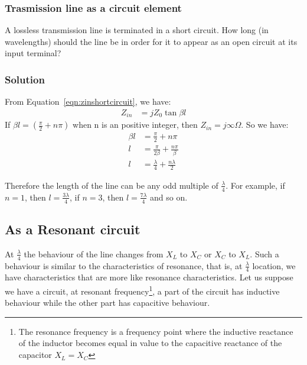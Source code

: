 \begin{exmp}
\subsubsection*{Trasmission line as a circuit element}
A lossless transmission line is terminated in a short circuit. How long (in wavelengths) should the line be in order for it to appear as an open circuit at its input terminal?

\subsubsection*{Solution}
From Equation~\eqref{eqn:zinshortcircuit}, we have:
\begin{align*}
Z_{in} &= jZ_{0}\tan\beta l
\end{align*}
If $\beta l = (\frac{\pi}{2} + n\pi)$ when n is an positive integer, then $Z_{in} = j\infty\varOmega$. So we have:
\begin{align*}
\beta l &= \frac{\pi}{2} + n\pi\\
l &= \frac{\pi}{2\beta} + \frac{n\pi}{\beta}\\
l &= \frac{\lambda}{4} + \frac{n\lambda}{2}
\end{align*}

Therefore the length of the line can be any odd multiple of $\frac{\lambda}{4}$. For example, if $n = 1$, then $l = \frac{3\lambda}{4}$, if $n = 3$, then $l = \frac{7\lambda}{4}$ and so on.
\end{exmp}

\subsection{As a Resonant circuit}
At $ \frac{\lambda}{4} $ the behaviour of the line changes from $ X_{L} $ to $ X_{C} $ or $ X_{C} $ to $ X_{L} $. Such a behaviour is similar to the characteristics of resonance, that is, at $\frac{\lambda}{4}$ location, we have characteristics that are more like resonance characteristics. Let us suppose we have a circuit, at resonant frequency\footnote{
The resonance frequency is a frequency point where the inductive reactance of the inductor becomes equal in value to the capacitive reactance of the capacitor $ X_{L} = X_{C} $
}, a part of the circuit has inductive behaviour while the other part has capacitive behaviour. 

